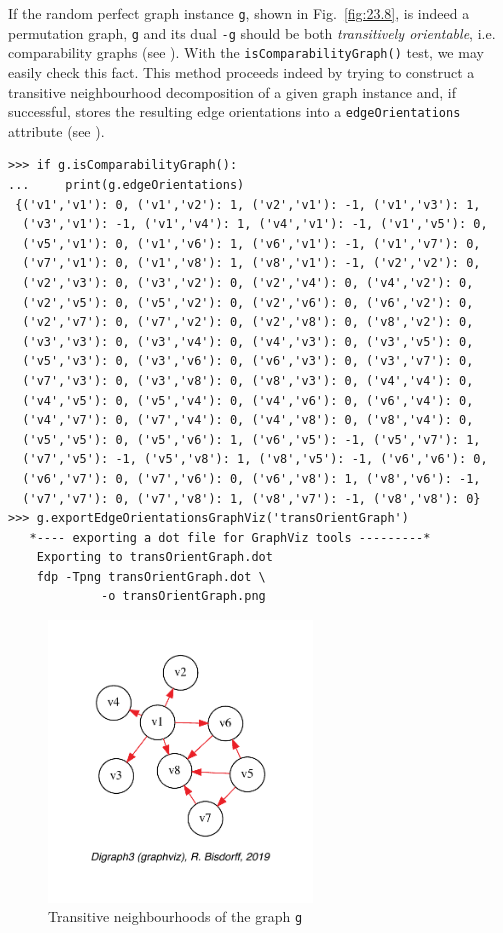 If the random perfect graph instance \texttt{g}, shown in Fig.~\vref{fig:23.8}, is indeed a permutation graph, \texttt{g} and its dual \texttt{-g} should be both \emph{transitively orientable}, i.e. comparability graphs (see \citet{GOL-2004}). With the \texttt{isComparabilityGraph()} test, we may easily check this fact. This method proceeds indeed by trying to construct a transitive neighbourhood decomposition of a given graph instance and, if successful, stores the resulting edge orientations into a \texttt{edgeOrientations} attribute (see \citet[p.129-132]{GOL-2004}).
\begin{lstlisting}[basicstyle=\scriptsize]
>>> if g.isComparabilityGraph():
...     print(g.edgeOrientations)  
 {('v1','v1'): 0, ('v1','v2'): 1, ('v2','v1'): -1, ('v1','v3'): 1,
  ('v3','v1'): -1, ('v1','v4'): 1, ('v4','v1'): -1, ('v1','v5'): 0,
  ('v5','v1'): 0, ('v1','v6'): 1, ('v6','v1'): -1, ('v1','v7'): 0,
  ('v7','v1'): 0, ('v1','v8'): 1, ('v8','v1'): -1, ('v2','v2'): 0,
  ('v2','v3'): 0, ('v3','v2'): 0, ('v2','v4'): 0, ('v4','v2'): 0,
  ('v2','v5'): 0, ('v5','v2'): 0, ('v2','v6'): 0, ('v6','v2'): 0,
  ('v2','v7'): 0, ('v7','v2'): 0, ('v2','v8'): 0, ('v8','v2'): 0,
  ('v3','v3'): 0, ('v3','v4'): 0, ('v4','v3'): 0, ('v3','v5'): 0,
  ('v5','v3'): 0, ('v3','v6'): 0, ('v6','v3'): 0, ('v3','v7'): 0,
  ('v7','v3'): 0, ('v3','v8'): 0, ('v8','v3'): 0, ('v4','v4'): 0,
  ('v4','v5'): 0, ('v5','v4'): 0, ('v4','v6'): 0, ('v6','v4'): 0,
  ('v4','v7'): 0, ('v7','v4'): 0, ('v4','v8'): 0, ('v8','v4'): 0,
  ('v5','v5'): 0, ('v5','v6'): 1, ('v6','v5'): -1, ('v5','v7'): 1,
  ('v7','v5'): -1, ('v5','v8'): 1, ('v8','v5'): -1, ('v6','v6'): 0,
  ('v6','v7'): 0, ('v7','v6'): 0, ('v6','v8'): 1, ('v8','v6'): -1,
  ('v7','v7'): 0, ('v7','v8'): 1, ('v8','v7'): -1, ('v8','v8'): 0}
>>> g.exportEdgeOrientationsGraphViz('transOrientGraph')
   *---- exporting a dot file for GraphViz tools ---------*
    Exporting to transOrientGraph.dot
    fdp -Tpng transOrientGraph.dot \
             -o transOrientGraph.png
\end{lstlisting}		    
\begin{figure}[h]
\sidecaption[t]
\includegraphics[width=7cm]{Figures/23-9-transOrientGraph.pdf}
\caption{Transitive neighbourhoods of the graph \texttt{g}} 
\label{fig:23.9}       %
\end{figure}


